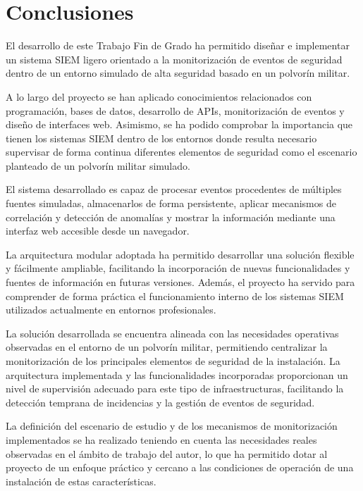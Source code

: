 
\section{Conclusiones}

El desarrollo de este Trabajo Fin de Grado ha permitido diseñar e implementar un sistema SIEM ligero orientado a la monitorización de eventos de seguridad dentro de un entorno simulado de alta seguridad basado en un polvorín militar.

A lo largo del proyecto se han aplicado conocimientos relacionados con programación, bases de datos, desarrollo de APIs, monitorización de eventos y diseño de interfaces web. Asimismo, se ha podido comprobar la importancia que tienen los sistemas SIEM dentro de los entornos donde resulta necesario supervisar de forma continua diferentes elementos de seguridad como el escenario planteado de un polvorín militar simulado.

El sistema desarrollado es capaz de procesar eventos procedentes de múltiples fuentes simuladas, almacenarlos de forma persistente, aplicar mecanismos de correlación y detección de anomalías y mostrar la información mediante una interfaz web accesible desde un navegador.

La arquitectura modular adoptada ha permitido desarrollar una solución flexible y fácilmente ampliable, facilitando la incorporación de nuevas funcionalidades y fuentes de información en futuras versiones. Además, el proyecto ha servido para comprender de forma práctica el funcionamiento interno de los sistemas SIEM utilizados actualmente en entornos profesionales.

La solución desarrollada se encuentra alineada con las necesidades operativas observadas en el entorno de un polvorín militar, permitiendo centralizar la monitorización de los principales elementos de seguridad de la instalación. La arquitectura implementada y las funcionalidades incorporadas proporcionan un nivel de supervisión adecuado para este tipo de infraestructuras, facilitando la detección temprana de incidencias y la gestión de eventos de seguridad.

La definición del escenario de estudio y de los mecanismos de monitorización implementados se ha realizado teniendo en cuenta las necesidades reales observadas en el ámbito de trabajo del autor, lo que ha permitido dotar al proyecto de un enfoque práctico y cercano a las condiciones de operación de una instalación de estas características.


